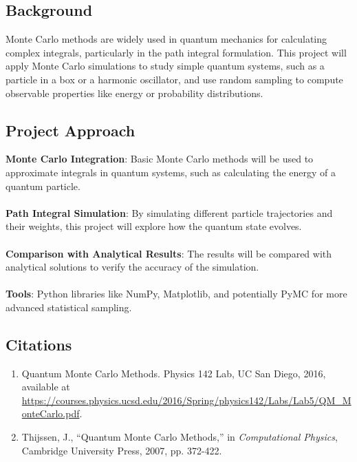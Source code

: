 \documentclass{article}
\begin{document}
\subsection{Background}
Monte Carlo methods are widely used in quantum mechanics for calculating complex integrals, particularly in the path integral formulation. This project will apply Monte Carlo simulations to study simple quantum systems, such as a particle in a box or a harmonic oscillator, and use random sampling to compute observable properties like energy or probability distributions.

\subsection{Project Approach}
\textbf{Monte Carlo Integration}: Basic Monte Carlo methods will be used to approximate integrals in quantum systems, such as calculating the energy of a quantum particle.\\\\
\textbf{Path Integral Simulation}: By simulating different particle trajectories and their weights, this project will explore how the quantum state evolves.\\\\
\textbf{Comparison with Analytical Results}: The results will be compared with analytical solutions to verify the accuracy of the simulation.\\\\
\textbf{Tools}: Python libraries like NumPy, Matplotlib, and potentially PyMC for more advanced statistical sampling.

\subsection*{Citations}
\begin{enumerate}
    \item Quantum Monte Carlo Methods. Physics 142 Lab, UC San Diego, 2016, available at \url{https://courses.physics.ucsd.edu/2016/Spring/physics142/Labs/Lab5/QM_MonteCarlo.pdf}.
    \item Thijssen, J., “Quantum Monte Carlo Methods,” in \textit{Computational Physics}, Cambridge University Press, 2007, pp. 372-422.
\end{enumerate}
\end{document}
